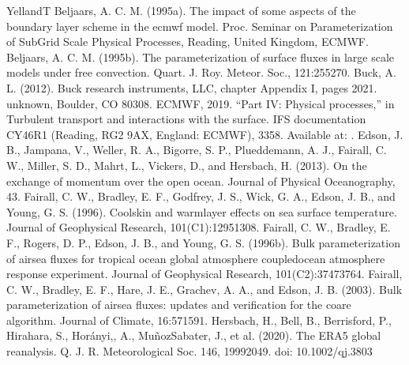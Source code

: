 \documentclass[letterpaper,10pt,english]{sphinxmanual}
\begin{document}
\begin{sphinxthebibliography}{YellandT}
\sphinxAtStartPar
Beljaars, A. C. M. (1995a). The impact of some aspects of the boundary layer scheme in the ecmwf model. Proc. Seminar on Parameterization of Sub\sphinxhyphen{}Grid Scale Physical Processes, Reading, United Kingdom, ECMWF.
\sphinxAtStartPar
Beljaars, A. C. M. (1995b). The parameterization of surface fluxes in large scale models under free convection. Quart. J. Roy. Meteor. Soc., 121:255\textendash{}270.
\sphinxAtStartPar
Buck, A. L. (2012). Buck research instruments, LLC, chapter Appendix I, pages 20\textendash{}21. unknown, Boulder, CO 80308.
\sphinxAtStartPar
ECMWF, 2019. “Part IV: Physical processes,” in Turbulent transport and interactions with the surface. IFS documentation CY46R1 (Reading, RG2 9AX, England: ECMWF), 33\textendash{}58. Available at: .
\sphinxAtStartPar
Edson, J. B., Jampana, V., Weller, R. A., Bigorre, S. P., Plueddemann, A. J., Fairall, C. W., Miller, S. D., Mahrt, L., Vickers, D., and Hersbach, H. (2013). On the exchange of momentum over the open ocean. Journal of Physical Oceanography, 43.
\sphinxAtStartPar
Fairall, C. W., Bradley, E. F., Godfrey, J. S., Wick, G. A., Edson, J. B., and Young, G. S. (1996). Cool\sphinxhyphen{}skin and warm\sphinxhyphen{}layer effects on sea surface temperature. Journal of Geophysical Research, 101(C1):1295\textendash{}1308.
\sphinxAtStartPar
Fairall, C. W., Bradley, E. F., Rogers, D. P., Edson, J. B., and Young, G. S. (1996b). Bulk parameterization of air\sphinxhyphen{}sea fluxes for tropical ocean global atmosphere coupled\sphinxhyphen{}ocean atmosphere response experiment. Journal of Geophysical Research, 101(C2):3747\textendash{}3764.
\sphinxAtStartPar
Fairall, C. W., Bradley, E. F., Hare, J. E., Grachev, A. A., and Edson, J. B. (2003). Bulk parameterization of air\sphinxhyphen{}sea fluxes: updates and verification for the coare algorithm. Journal of Climate, 16:571\textendash{}591.
\sphinxAtStartPar
Hersbach, H., Bell, B., Berrisford, P., Hirahara, S., Horányi,, A., Muñoz\sphinxhyphen{}Sabater, J., et al. (2020). The ERA5 global reanalysis. Q. J. R. Meteorological Soc. 146, 1999\textendash{}2049. doi: 10.1002/qj.3803

\end{sphinxthebibliography}
\end{document}
